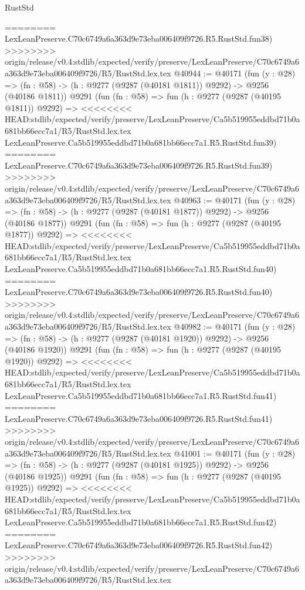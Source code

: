 \begin{lexlean}{RustStd}
\begin{coremodule}
{\begin{coremodule}
{{{{{{{{{{{{{{{{{{{{{{{{{{{{{{{{{{{{{{{{{{{{{{{{{{{{{{{========
    LexLeanPreserve.C70c6749a6a363d9e73eba006409f9726.R5.RustStd.fun38)
>>>>>>>> origin/release/v0.4:stdlib/expected/verify/preserve/LexLeanPreserve/C70c6749a6a363d9e73eba006409f9726/R5/RustStd.lex.tex
@40944 := @40171
    (fun (y : @28) =>
    (fn : @58) -> (h : @9277 (@9287 (@40181 @1811)) @9292) -> @9256 (@40186 @1811))
    @9291
    (fun (fn : @58) =>
    fun (h : @9277 (@9287 (@40195 @1811)) @9292) =>
<<<<<<<< HEAD:stdlib/expected/verify/preserve/LexLeanPreserve/Ca5b519955eddbd71b0a681bb66ecc7a1/R5/RustStd.lex.tex
    LexLeanPreserve.Ca5b519955eddbd71b0a681bb66ecc7a1.R5.RustStd.fun39)
========
    LexLeanPreserve.C70c6749a6a363d9e73eba006409f9726.R5.RustStd.fun39)
>>>>>>>> origin/release/v0.4:stdlib/expected/verify/preserve/LexLeanPreserve/C70c6749a6a363d9e73eba006409f9726/R5/RustStd.lex.tex
@40963 := @40171
    (fun (y : @28) =>
    (fn : @58) -> (h : @9277 (@9287 (@40181 @1877)) @9292) -> @9256 (@40186 @1877))
    @9291
    (fun (fn : @58) =>
    fun (h : @9277 (@9287 (@40195 @1877)) @9292) =>
<<<<<<<< HEAD:stdlib/expected/verify/preserve/LexLeanPreserve/Ca5b519955eddbd71b0a681bb66ecc7a1/R5/RustStd.lex.tex
    LexLeanPreserve.Ca5b519955eddbd71b0a681bb66ecc7a1.R5.RustStd.fun40)
========
    LexLeanPreserve.C70c6749a6a363d9e73eba006409f9726.R5.RustStd.fun40)
>>>>>>>> origin/release/v0.4:stdlib/expected/verify/preserve/LexLeanPreserve/C70c6749a6a363d9e73eba006409f9726/R5/RustStd.lex.tex
@40982 := @40171
    (fun (y : @28) =>
    (fn : @58) -> (h : @9277 (@9287 (@40181 @1920)) @9292) -> @9256 (@40186 @1920))
    @9291
    (fun (fn : @58) =>
    fun (h : @9277 (@9287 (@40195 @1920)) @9292) =>
<<<<<<<< HEAD:stdlib/expected/verify/preserve/LexLeanPreserve/Ca5b519955eddbd71b0a681bb66ecc7a1/R5/RustStd.lex.tex
    LexLeanPreserve.Ca5b519955eddbd71b0a681bb66ecc7a1.R5.RustStd.fun41)
========
    LexLeanPreserve.C70c6749a6a363d9e73eba006409f9726.R5.RustStd.fun41)
>>>>>>>> origin/release/v0.4:stdlib/expected/verify/preserve/LexLeanPreserve/C70c6749a6a363d9e73eba006409f9726/R5/RustStd.lex.tex
@41001 := @40171
    (fun (y : @28) =>
    (fn : @58) -> (h : @9277 (@9287 (@40181 @1925)) @9292) -> @9256 (@40186 @1925))
    @9291
    (fun (fn : @58) =>
    fun (h : @9277 (@9287 (@40195 @1925)) @9292) =>
<<<<<<<< HEAD:stdlib/expected/verify/preserve/LexLeanPreserve/Ca5b519955eddbd71b0a681bb66ecc7a1/R5/RustStd.lex.tex
    LexLeanPreserve.Ca5b519955eddbd71b0a681bb66ecc7a1.R5.RustStd.fun42)
========
    LexLeanPreserve.C70c6749a6a363d9e73eba006409f9726.R5.RustStd.fun42)
>>>>>>>> origin/release/v0.4:stdlib/expected/verify/preserve/LexLeanPreserve/C70c6749a6a363d9e73eba006409f9726/R5/RustStd.lex.tex
}}}}}}}}}}}}}}}}}}}}}}}}}}}}}}}}}}}}}}}}}}}}}}}}}}}}}}}
\end{coremodule}}
\end{coremodule}
\end{lexlean}
